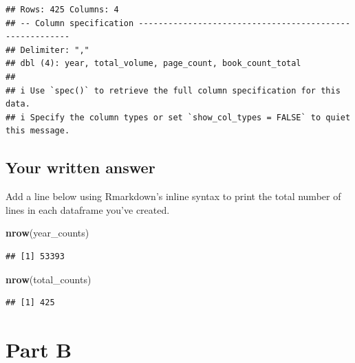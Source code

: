 \documentclass[
]{article}
\newenvironment{Shaded}{\begin{snugshade}}{\end{snugshade}}
\newcommand{\CommentTok}[1]{\textcolor[rgb]{0.56,0.35,0.01}{\textit{#1}}}
\newcommand{\FunctionTok}[1]{\textcolor[rgb]{0.13,0.29,0.53}{\textbf{#1}}}
\newcommand{\NormalTok}[1]{#1}
\newcommand{\OtherTok}[1]{\textcolor[rgb]{0.56,0.35,0.01}{#1}}
\newcommand{\SpecialCharTok}[1]{\textcolor[rgb]{0.81,0.36,0.00}{\textbf{#1}}}
\newcommand{\StringTok}[1]{\textcolor[rgb]{0.31,0.60,0.02}{#1}}
\begin{document}
\begin{verbatim}
## Rows: 425 Columns: 4
## -- Column specification --------------------------------------------------------
## Delimiter: ","
## dbl (4): year, total_volume, page_count, book_count_total
## 
## i Use `spec()` to retrieve the full column specification for this data.
## i Specify the column types or set `show_col_types = FALSE` to quiet this message.
\end{verbatim}

\begin{Shaded}
\end{Shaded}

\hypertarget{your-written-answer}{%
\subsection{Your written answer}\label{your-written-answer}}

Add a line below using Rmarkdown's inline syntax to print the total
number of lines in each dataframe you've created.

\begin{Shaded}
\begin{Highlighting}[]
\FunctionTok{nrow}\NormalTok{(year\_counts)}
\end{Highlighting}
\end{Shaded}

\begin{verbatim}
## [1] 53393
\end{verbatim}

\begin{Shaded}
\begin{Highlighting}[]
\FunctionTok{nrow}\NormalTok{(total\_counts)}
\end{Highlighting}
\end{Shaded}

\begin{verbatim}
## [1] 425
\end{verbatim}

\hypertarget{part-b}{%
\section{Part B}\label{part-b}}
\end{document}

